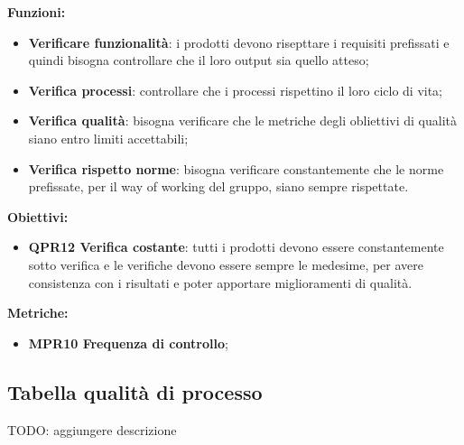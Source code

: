 \documentclass[../piano_di_qualifica.tex]{subfiles}
\begin{document}
\textbf{Funzioni:}
\smallbreak
\begin{itemize}
	\item \textbf{Verificare funzionalità}:  i prodotti devono risepttare i requisiti prefissati e quindi bisogna controllare che il loro output sia quello atteso;
	\item \textbf{Verifica processi}:  controllare che i processi rispettino il loro ciclo di vita;
	\item \textbf{Verifica qualità}:  bisogna verificare che le metriche degli obliettivi di qualità siano entro limiti accettabili;
	\item \textbf{Verifica rispetto norme}: bisogna verificare constantemente che le norme prefissate, per il way of working del gruppo, siano sempre rispettate.
\end{itemize}

\textbf{Obiettivi:}
\smallbreak
\begin{itemize}
	\item \textbf{QPR12 Verifica costante}: tutti i prodotti devono essere constantemente sotto verifica e le verifiche devono essere sempre le medesime, per avere consistenza con i risultati e poter apportare miglioramenti di qualità.
\end{itemize}

\textbf{Metriche:}
\smallbreak
\begin{itemize}
	\item \textbf{MPR10 Frequenza di controllo};
\end{itemize}

\subsection{Tabella qualità di processo}

TODO: aggiungere descrizione
\end{document}
